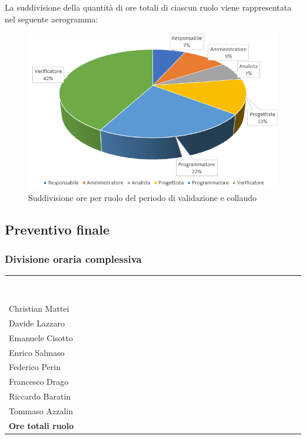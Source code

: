 La suddivisione della quantità di ore totali di ciascun ruolo viene rappresentata nel seguente aerogramma:

\begin{figure}[h]
	\centering
	\includegraphics[scale=2.5]{sezioni/Aerogrammi/AerogrammaValidazione.png}
	\caption{Suddivisione ore per ruolo del periodo di validazione e collaudo}
\end{figure}


\clearpage
\subsection{Preventivo finale}
\subsubsection{Divisione oraria complessiva}
{
	\renewcommand{\arraystretch}{2}
	\centering
	\begin{longtable}{ C{5cm} C{1cm} C{1cm} C{1cm} C{1cm} C{1cm} C{1cm} C{3cm}}
		\textcolor{white}{\textbf{Nome membro del gruppo}} & \textcolor{white}{\textbf{RE}} & \textcolor{white}{\textbf{AM}} & \textcolor{white}{\textbf{AN}} & \textcolor{white}{\textbf{PT}} & \textcolor{white}{\textbf{PR}} & \textcolor{white}{\textbf{VE}} & \textcolor{white}{\textbf{Ore complessive}}\\	
        
        Christian Mattei & & & & & & & \\
        Davide Lazzaro & & & & & & & \\
        Emanuele Cisotto & & & & & & & \\
        Enrico Salmaso & & & & & & & \\
        Federico Perin & & & & & & & \\
        Francesco Drago & & & & & & & \\
        Riccardo Baratin & & & & & & & \\
        Tommaso Azzalin & & & & & & & \\
        \textbf{Ore totali ruolo} & & & & & & & \\
		
	\end{longtable}
}
